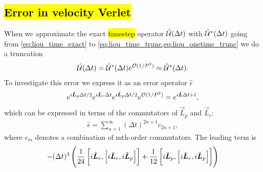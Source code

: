 \subsection[Error in velocity Verlet]{\hl{Error in velocity Verlet}}
\newcommand{\errop}{\hat{\epsilon}}
When we approximate the exact \hl{timestep} operator $\hat{\mathcal{U}} (\Delta t)$ with $\hat{\mathcal{U}}^*(\Delta t)$ going from \cref{eq:liou_time_exact} to \cref{eq:liou_time_trunc,eq:liou_onetime_trunc} we do a truncation 
\begin{align*}
    \hat{\mathcal{U}}(\Delta t) = \hat{\mathcal{U}}^*(\Delta t) e^{\mathcal{O}(1/P^2)} \approx \hat{\mathcal{U}}^*(\Delta t).
\end{align*}
To investigate this error we express it as an error operator $\errop$
\begin{align*}
    e^{\Liou_p\Delta t/2} e^{\Liou_r \Delta t} e^{\Liou_p \Delta t/2} e^{\mathcal{O}(1/P^2)}
    = e^{\Liou \Delta t + \errop},
\end{align*}
which can be expressed in terms of the commutators of $\vec L_p$ and $\vec L_r$:
\begin{align*}
    \errop = \sum_{n=1}^\infty (\Delta t)^{2n+1} c_{2n+1},
\end{align*}
where $c_m$ denotes a combination of mth-order commutators. The leading term is
\begin{align*}
    -(\Delta t)^3 \left( \frac{1}{24} \left[ i\hat{\boldsymbol{L}}_r, \left[ i\hat{\boldsymbol{L}}_r, i\hat{\boldsymbol{L}}_p \right] \right] + \frac{1}{12} \left[ i\hat{\boldsymbol{L}}_p, \left[ i\hat{\boldsymbol{L}}_r, i\hat{\boldsymbol{L}}_p \right] \right] \right)
\end{align*}















